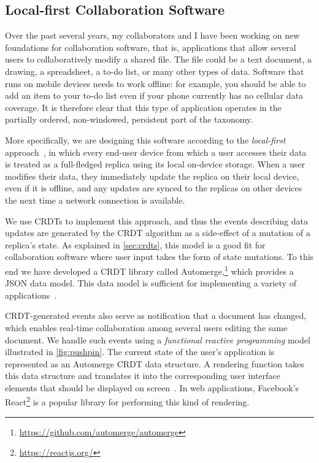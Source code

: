 \documentclass[sigconf]{acmart}
\begin{document}
\subsection{Local-first Collaboration Software}\label{sec:collaboration}

Over the past several years, my collaborators and I have been working on new foundations for collaboration software, that is, applications that allow several users to collaboratively modify a shared file.
The file could be a text document, a drawing, a spreadsheet, a to-do list, or many other types of data.
Software that runs on mobile devices needs to work offline: for example, you should be able to add an item to your to-do list even if your phone currently has no cellular data coverage.
It is therefore clear that this type of application operates in the partially ordered, non-windowed, persistent part of the taxonomy.

More specifically, we are designing this software according to the \emph{local-first} approach~\cite{Kleppmann:2019}, in which every end-user device from which a user accesses their data is treated as a full-fledged replica using its local on-device storage.
When a user modifies their data, they immediately update the replica on their local device, even if it is offline, and any updates are synced to the replicas on other devices the next time a network connection is available.

We use CRDTs to implement this approach, and thus the events describing data updates are generated by the CRDT algorithm as a side-effect of a mutation of a replica's state.
As explained in \autoref{sec:crdts}, this model is a good fit for collaboration software where user input takes the form of state mutations.
To this end we have developed a CRDT library called Automerge,\footnote{\url{https://github.com/automerge/automerge}} which provides a JSON data model.
This data model is sufficient for implementing a variety of applications~\cite{Kleppmann:2019,vanHardenberg:2020}.

CRDT-generated events also serve as notification that a document has changed, which enables real-time collaboration among several users editing the same document.
We handle such events using a \emph{functional reactive programming} model illustrated in \autoref{fig:pushpin}.
The current state of the user's application is represented as an Automerge CRDT data structure.
A rendering function takes this data structure and translates it into the corresponding user interface elements that should be displayed on screen~\cite{vanHardenberg:2020}.
In web applications, Facebook's React\footnote{\url{https://reactjs.org/}} is a popular library for performing this kind of rendering.
\end{document}
